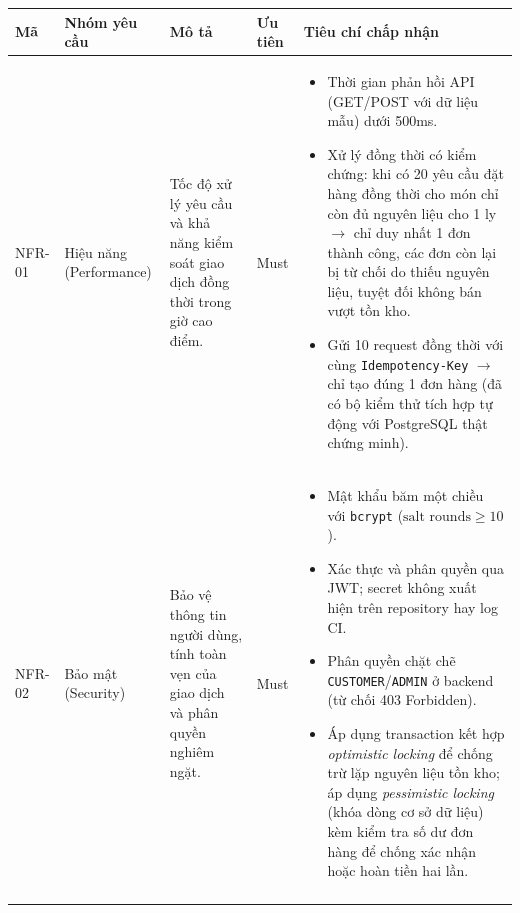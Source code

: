 \begin{longtable}{@{}p{1.4cm}p{3.2cm}p{5.0cm}p{1.4cm}p{5.0cm}@{}}
\toprule
\textbf{Mã} & \textbf{Nhóm yêu cầu} & \textbf{Mô tả} & \textbf{Ưu tiên} & \textbf{Tiêu chí chấp nhận} \\
\midrule
\endhead

NFR-01 & Hiệu năng (Performance)
  & Tốc độ xử lý yêu cầu và khả năng kiểm soát giao dịch đồng thời trong giờ cao điểm.
  & Must
  & \begin{itemize}[leftmargin=*]
      \item Thời gian phản hồi API (GET/POST với dữ liệu mẫu) dưới 500ms.
      \item Xử lý đồng thời có kiểm chứng: khi có 20 yêu cầu đặt hàng đồng thời cho món chỉ còn đủ nguyên liệu cho 1 ly $\rightarrow$ chỉ duy nhất 1 đơn thành công, các đơn còn lại bị từ chối do thiếu nguyên liệu, tuyệt đối không bán vượt tồn kho.
      \item Gửi 10 request đồng thời với cùng \texttt{Idempotency-Key} $\rightarrow$ chỉ tạo đúng 1 đơn hàng (đã có bộ kiểm thử tích hợp tự động với PostgreSQL thật chứng minh).
    \end{itemize} \\
\addlinespace

NFR-02 & Bảo mật (Security)
  & Bảo vệ thông tin người dùng, tính toàn vẹn của giao dịch và phân quyền nghiêm ngặt.
  & Must
  & \begin{itemize}[leftmargin=*]
      \item Mật khẩu băm một chiều với \texttt{bcrypt} ($\text{salt rounds} \ge 10$).
      \item Xác thực và phân quyền qua JWT; secret không xuất hiện trên repository hay log CI.
      \item Phân quyền chặt chẽ \texttt{CUSTOMER}/\texttt{ADMIN} ở backend (từ chối 403 Forbidden).
      \item Áp dụng transaction kết hợp \emph{optimistic locking} để chống trừ lặp nguyên liệu tồn kho; áp dụng \emph{pessimistic locking} (khóa dòng cơ sở dữ liệu) kèm kiểm tra số dư đơn hàng để chống xác nhận hoặc hoàn tiền hai lần.
    \end{itemize} \\
\addlinespace


\end{longtable}
